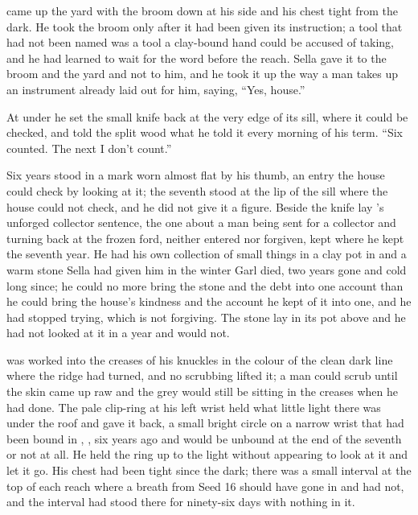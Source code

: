 \scenebreak

 came up the yard with the broom down at his side and his chest tight from the dark. He took the broom only after it had been given its instruction; a tool that had not been named was a tool a clay-bound hand could be accused of taking, and he had learned to wait for the word before the reach. Sella gave it to the broom and the yard and not to him, and he took it up the way a man takes up an instrument already laid out for him, saying, “Yes, house.”

At  under  he set the small knife back at the very edge of its sill, where it could be checked, and told the split wood what he told it every morning of his term. “Six counted. The next I don't count.”

Six years stood in a mark worn almost flat by his thumb, an entry the house could check by looking at it; the seventh stood at the lip of the sill where the house could not check, and he did not give it a figure. Beside the knife lay 's unforged collector sentence, the one about a man being sent for a collector and turning back at the frozen ford, neither entered nor forgiven, kept where he kept the seventh year. He had his own collection of small things in a clay pot in  and a warm stone Sella had given him in the winter Garl died, two years gone and cold long since; he could no more bring the stone and the debt into one account than he could bring the house's kindness and the account he kept of it into one, and he had stopped trying, which is not forgiving. The stone lay in its pot above  and he had not looked at it in a year and would not.

 was worked into the creases of his knuckles in the colour of the clean dark line where the ridge had turned, and no scrubbing lifted it; a man could scrub until the skin came up raw and the grey would still be sitting in the creases when he had done. The pale clip-ring at his left wrist held what little light there was under the roof and gave it back, a small bright circle on a narrow wrist that had been bound in , ,  six years ago and would be unbound at the end of the seventh or not at all. He held the ring up to the light without appearing to look at it and let it go. His chest had been tight since the dark; there was a small interval at the top of each reach where a breath from Seed 16 should have gone in and had not, and the interval had stood there for ninety-six days with nothing in it.


